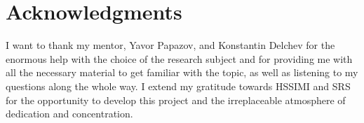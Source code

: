 \documentclass[11pt, a4paper]{article}
\theoremstyle{definition}
\begin{document}
\section{Acknowledgments}
I want to thank my mentor, Yavor Papazov, and Konstantin Delchev for the enormous help with the choice of the research subject and for providing me with all the necessary material to get familiar with the topic, as well as listening to my questions along the whole way. I extend my gratitude towards HSSIMI and SRS for the opportunity to develop this project and the irreplaceable atmosphere of dedication and concentration.

\nocite{*}

\end{document}
